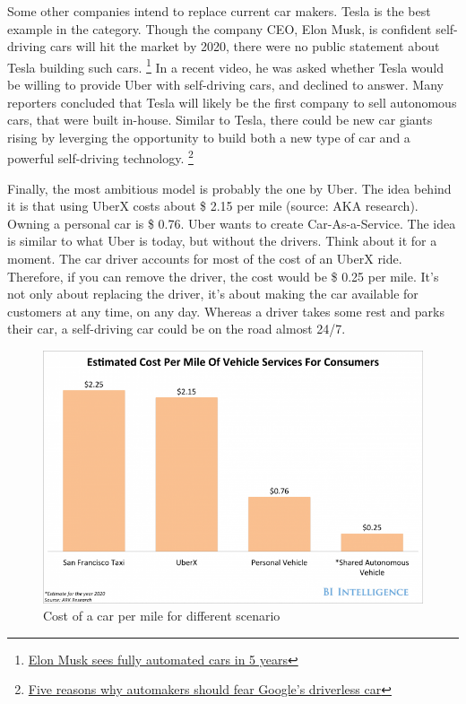 \documentclass[12pt]{article}
\begin{document}
Some other companies intend to replace current car makers. Tesla is the best
example in the category. Though the company CEO, Elon Musk, is confident
self-driving cars will hit the market by 2020, there were no public statement
about Tesla building such cars. \footnote{\href{http://my.teslamotors.com/fr_CH/forum/forums/tesla\%E2\%80\%99s-musk-sees-fully-autonomous-car-ready-5-years}
{Elon Musk sees fully automated cars in 5 years}} In a recent video, he was asked whether Tesla
would be willing to provide Uber with self-driving cars, and declined to answer.
Many reporters concluded that Tesla will likely be the first company to sell
autonomous cars, that were built in-house. Similar to Tesla, there could be new
car giants rising by leverging the opportunity to build both a new type of car
and a powerful self-driving technology. \footnote{\href{http://www.forbes.com/sites/chunkamui/2014/08/04/5-reasons-why-automakers-should-fear-googles-driverless-car/}
{Five reasons why automakers should fear Google's driverless car}}

Finally, the most ambitious model is probably the one by Uber. The idea behind
it is that using UberX costs about \$ 2.15 per mile (source: AKA research).
Owning a personal car is \$ 0.76. Uber wants to create Car-As-a-Service.
The idea is similar to what Uber is today, but without the drivers. Think about
it for a moment. The car driver accounts for most of the cost of an UberX ride.
Therefore, if you can remove the driver, the cost would be \$ 0.25 per mile.
It's not only about replacing the driver, it's about making the car available
for customers at any time, on any day. Whereas a driver takes some rest and
parks their car, a self-driving car could be on the road almost 24/7.

\medskip

\begin{figure}[h]
    \centering
    \includegraphics[width=\linewidth]{vehicle-cost}
    \caption{Cost of a car per mile for different scenario}
    \label{fig:cost_of_car}
\end{figure}
\end{document}
